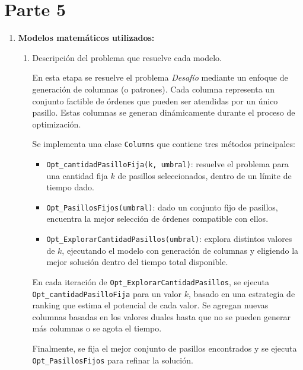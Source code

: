 \documentclass[a4paper,12pt]{article}
\begin{document}
\clearpage

\section{Parte 5}
\label{sec:variante5}

\begin{enumerate}[label=(\alph*), leftmargin=2em]
    \item \textbf{Modelos matemáticos utilizados:}
    \begin{enumerate}[label=\roman*., leftmargin=0.2em]
    
        \item Descripción del problema que resuelve cada modelo.
        
            En esta etapa se resuelve el problema \textit{Desafío} mediante un enfoque de generación de columnas (o patrones). Cada columna representa un conjunto factible de órdenes que pueden ser atendidas por un único pasillo. Estas columnas se generan dinámicamente durante el proceso de optimización.

            Se implementa una clase \texttt{Columns} que contiene tres métodos principales:
            \begin{itemize}
                \item \texttt{Opt\_cantidadPasilloFija(k, umbral)}: resuelve el problema para una cantidad fija \(k\) de pasillos seleccionados, dentro de un límite de tiempo dado.
                \item \texttt{Opt\_PasillosFijos(umbral)}: dado un conjunto fijo de pasillos, encuentra la mejor selección de órdenes compatible con ellos.
                \item \texttt{Opt\_ExplorarCantidadPasillos(umbral)}: explora distintos valores de \(k\), ejecutando el modelo con generación de columnas y eligiendo la mejor solución dentro del tiempo total disponible.
            \end{itemize}

            En cada iteración de \texttt{Opt\_ExplorarCantidadPasillos}, se ejecuta \texttt{Opt\_cantidadPasilloFija} para un valor \(k\), basado en una estrategia de ranking que estima el potencial de cada valor. Se agregan nuevas columnas basadas en los valores duales hasta que no se pueden generar más columnas o se agota el tiempo.

            Finalmente, se fija el mejor conjunto de pasillos encontrados y se ejecuta \texttt{Opt\_PasillosFijos} para refinar la solución.


\end{enumerate}
\end{enumerate}
\end{document}
